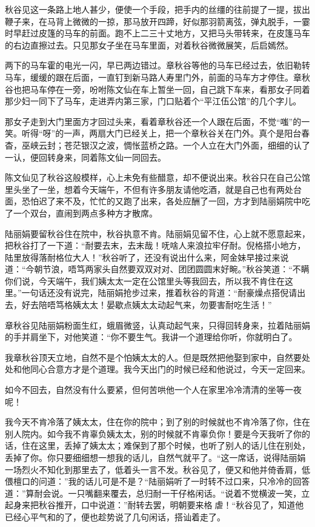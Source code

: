 \documentclass[12pt,UTF8]{ctexbook}
\begin{document}
{{{秋谷见这一条路上地人甚少，便使一个手段，把手内的丝缰的往前提了一提，拔出鞭子来，在马背上微微的一掠，那马放开四蹄，好似那羽箭离弦，弹丸脱手，一霎时早赶过皮篷的马车的前面。跑不上二三十丈地方，又把马头带转来，在皮篷马车的右边直擦过去。只见那女子坐在马车里面，对着秋谷微微展笑，后启嫣然。

两下的马车霍的电光一闪，早已两边错过。章秋谷等他的马车已经过去，依旧勒转马车，缓缓的跟在后面，一直钉到新马路人寿里门外，前面的马车方才停住。章秋谷也把马车停在一旁，吩咐陈文仙在车上暂坐一回，自己跳下车来，看那女子同着那少妇一同下了马车，走进弄内第三家，门口贴着个“平江伍公馆”的几个字儿。

那女子走到大门里面方才回过头来，看着章秋谷还一个人跟在后面，不觉“嗤”的一笑。听得“呀”的一声，两扇大门已经关上，把一个章秋谷关在门外。真个是阳台春杳，巫峡云封；苍茫银汉之波，惆怅蓝桥之路。一个人立在大门外面，细细的认了一认，便回转身来，同着陈文仙一同回去。

陈文仙见了秋谷这般模样，心上未免有些醋意，却不便说出来。秋谷只在自己公馆里头坐了一坐，想着今天端午，不但有许多朋友请他吃酒，就是自己也有两处台面，恐怕迟了来不及，忙忙的又跑了出来，各处应酬了一回，方才到陆丽娟院中吃了一个双台，直闹到两点多种方才散席。

陆丽娟要留秋谷住在院中，秋谷执意不肯。陆丽娟见留不住，心上就不愿意起来，把秋谷打了一下道：“耐要去末，去末哉！呒啥人来浪拉牢仔耐。倪格搭小地方，陆里放得落耐格位大人！”秋谷听了，还没有说出什么来，阿金妹早接过来说道：“今朝节浪，唔笃两家头自然要双双对对、团团圆圆末好畹。”秋谷笑道：“不瞒你们说，今天端午，我们姨太太一定在公馆里头等我回去，所以我不肯住在这里。”一句话还没有说完，陆丽娟抢步过来，推着秋谷的背道：“耐豪燥点搭倪请出去，好去陪唔笃格姨太太！晏歇点姨太太动起气来，勿要害耐吃生活！”

章秋谷见陆丽娟粉面生红，蛾眉微竖，认真动起气来，只得回转身来，拉着陆丽娟的手并肩坐下，对他笑道：“你不要生气。我讲一个道理给你听，你就明白了。

我章秋谷顶天立地，自然不是个怕姨太太的人。但是既然把他娶到家中，自然要处处和他同心合意方才是个道理。我今天出门的时候已经和他说过，今天一定回来。

如今不回去，自然没有什么要紧，但何苦哄他一个人在家里冷冷清清的坐等一夜呢！

我今天不肯冷落了姨太太，住在你的院中；到了别的时候就也不肯冷落了你，住在别人院内。如今我不肯辜负姨太太，别的时候就不肯辜负你！要是今天我听了你的话，住在这里，丢掉了姨太太；难保到了那个时候，也听了别人的话儿住在别处，丢掉了你。你只要细细想一想我的话儿，自然气就平了。“这一席话，说得陆丽娟一场烈火不知化到那里去了，低着头一言不发。秋谷见了，便又和他并倚香肩，低偎檀口的问道：”我的话儿可是不是？“陆丽娟听了一时转不过口来，只冷冷的回答道：”算耐会说。一只嘴翻来覆去，总归耐一干仔格闲话。“说着不觉横波一笑，立起身来把秋谷推开，口中说道：”耐转去罢，明朝要来格虐！“秋谷见了，知道他已经心平气和的了，便也趁势说了几句闲话，搭讪着走了。

}}}
\end{document}
